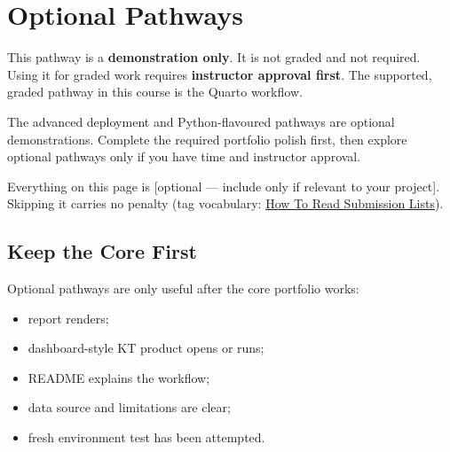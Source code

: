 \documentclass[
  letterpaper,
  DIV=11,
  numbers=noendperiod,
  oneside]{scrreprt}
\providecommand{\tightlist}{%
  \setlength{\itemsep}{0pt}\setlength{\parskip}{0pt}}
\begin{document}
\chapter*{Optional Pathways}\label{optional-pathways}


\begin{tcolorbox}[enhanced jigsaw, title=\textcolor{quarto-callout-warning-color}{\faExclamationTriangle}\hspace{0.5em}{Demo only --- not graded}, arc=.35mm, toptitle=1mm, colframe=quarto-callout-warning-color-frame, toprule=.15mm, leftrule=.75mm, bottomtitle=1mm, opacityback=0, bottomrule=.15mm, coltitle=black, breakable, opacitybacktitle=0.6, titlerule=0mm, colback=white, left=2mm, colbacktitle=quarto-callout-warning-color!10!white, rightrule=.15mm]

This pathway is a \textbf{demonstration only}. It is not graded and not
required. Using it for graded work requires \textbf{instructor approval
first}. The supported, graded pathway in this course is the Quarto
workflow.

\end{tcolorbox}

The advanced deployment and Python-flavoured pathways are optional
demonstrations. Complete the required portfolio polish first, then
explore optional pathways only if you have time and instructor approval.

Everything on this page is {[}optional --- include only if relevant to
your project{]}. Skipping it carries no penalty (tag vocabulary:
\hyperref[how-to-read-submission-lists]{How To Read Submission Lists}).

\section*{Keep the Core First}\label{keep-the-core-first}


Optional pathways are only useful after the core portfolio works:

\begin{itemize}
\tightlist
\item
  report renders;
\item
  dashboard-style KT product opens or runs;
\item
  README explains the workflow;
\item
  data source and limitations are clear;
\item
  fresh environment test has been attempted.
\end{itemize}
\end{document}
